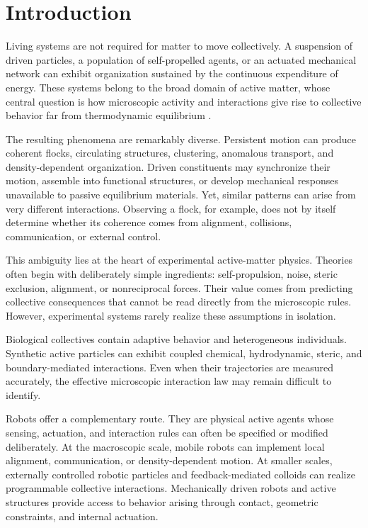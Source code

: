 \section{Introduction}
\label{sec:introduction}

Living systems are not required for matter to move
collectively. A suspension of driven particles, a
population of self-propelled agents, or an actuated
mechanical network can exhibit organization sustained
by the continuous expenditure of energy. These systems
belong to the broad domain of active matter, whose
central question is how microscopic activity and
interactions give rise to collective behavior far
from thermodynamic equilibrium
\cite{Marchetti2013hydrodynamics}
\cite{Ramaswamy2010mechanics}
\cite{Bechinger2016active}.

The resulting phenomena are remarkably diverse.
Persistent motion can produce coherent flocks,
circulating structures, clustering, anomalous
transport, and density-dependent organization.
Driven constituents may synchronize their motion,
assemble into functional structures, or develop
mechanical responses unavailable to passive
equilibrium materials. Yet, similar patterns
can arise from very different interactions.
Observing a flock, for example, does not
by itself determine whether its coherence
comes from alignment, collisions,
communication, or external control.

This ambiguity lies at the heart of
experimental active-matter physics.
Theories often begin with deliberately
simple ingredients: self-propulsion,
noise, steric exclusion, alignment,
or nonreciprocal forces. Their value
comes from predicting collective
consequences that cannot be read
directly from the microscopic rules.
However, experimental systems
rarely realize these assumptions
in isolation.

Biological collectives contain
adaptive behavior and heterogeneous
individuals. Synthetic active
particles can exhibit coupled
chemical, hydrodynamic, steric,
and boundary-mediated interactions.
Even when their trajectories
are measured accurately, the
effective microscopic interaction
law may remain difficult
to identify.

Robots offer a complementary route.
They are physical active agents
whose sensing, actuation, and
interaction rules can often
be specified or modified
deliberately. At the macroscopic
scale, mobile robots can implement
local alignment, communication,
or density-dependent motion.
At smaller scales, externally
controlled robotic particles
and feedback-mediated colloids
can realize programmable
collective interactions.
Mechanically driven robots
and active structures provide
access to behavior arising
through contact, geometric
constraints, and internal
actuation.

